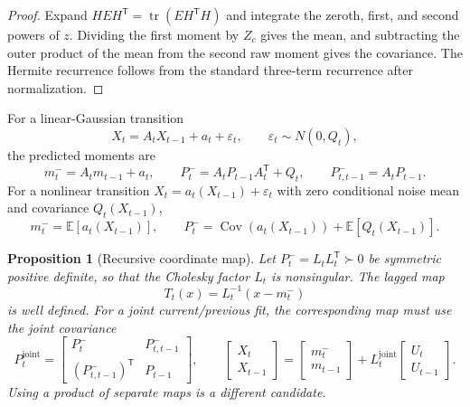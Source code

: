 \documentclass[11pt]{article}
\newtheorem{proposition}{Proposition}
\begin{document}
\begin{proof}
Expand $HEH^\mathsf T=\operatorname{tr}(EH^\mathsf TH)$ and integrate the
zeroth, first, and second powers of $z$. Dividing the first moment by $Z_c$
gives the mean, and subtracting the outer product of the mean from the second
raw moment gives the covariance. The Hermite recurrence follows from the
standard three-term recurrence after normalization.
\end{proof}

For a linear-Gaussian transition
\begin{equation}\label{eq:coherent-linear-transition}
  X_t=A_tX_{t-1}+a_t+\varepsilon_t,
  \qquad \varepsilon_t\sim N(0,Q_t),
\end{equation}
the predicted moments are
\begin{equation}\label{eq:coherent-linear-moments}
  m_t^-=A_tm_{t-1}+a_t,
  \qquad P_t^-=A_tP_{t-1}A_t^\mathsf T+Q_t,
  \qquad P_{t,t-1}^-=A_tP_{t-1}.
\end{equation}
For a nonlinear transition $X_t=a_t(X_{t-1})+\varepsilon_t$ with zero
conditional noise mean and covariance $Q_t(X_{t-1})$,
\begin{equation}\label{eq:coherent-nonlinear-moments}
  m_t^-=\mathbb E[a_t(X_{t-1})],
  \qquad P_t^-=\operatorname{Cov}(a_t(X_{t-1}))
       +\mathbb E[Q_t(X_{t-1})].
\end{equation}

\begin{proposition}[Recursive coordinate map]
\label{prop:coherent-map}
Let $P_t^-=L_tL_t^\mathsf T\succ0$ be symmetric positive definite, so that
the Cholesky factor $L_t$ is nonsingular. The lagged map
\begin{equation}\label{eq:coherent-map}
  T_t(x)=L_t^{-1}(x-m_t^-)
\end{equation}
is well defined. For a joint current/previous fit, the corresponding map must
use the joint covariance
\begin{equation}\label{eq:coherent-joint-covariance}
 P_t^{\mathrm{joint}}=
 \begin{bmatrix}P_t^-&P_{t,t-1}^-\\
 (P_{t,t-1}^-)^\mathsf T&P_{t-1}\end{bmatrix},
 \qquad
 \begin{bmatrix}X_t\\X_{t-1}\end{bmatrix}
 =\begin{bmatrix}m_t^-\\m_{t-1}\end{bmatrix}
 +L_t^{\mathrm{joint}}\begin{bmatrix}U_t\\U_{t-1}\end{bmatrix}.
\end{equation}
Using a product of separate maps is a different candidate.
\end{proposition}
\end{document}
